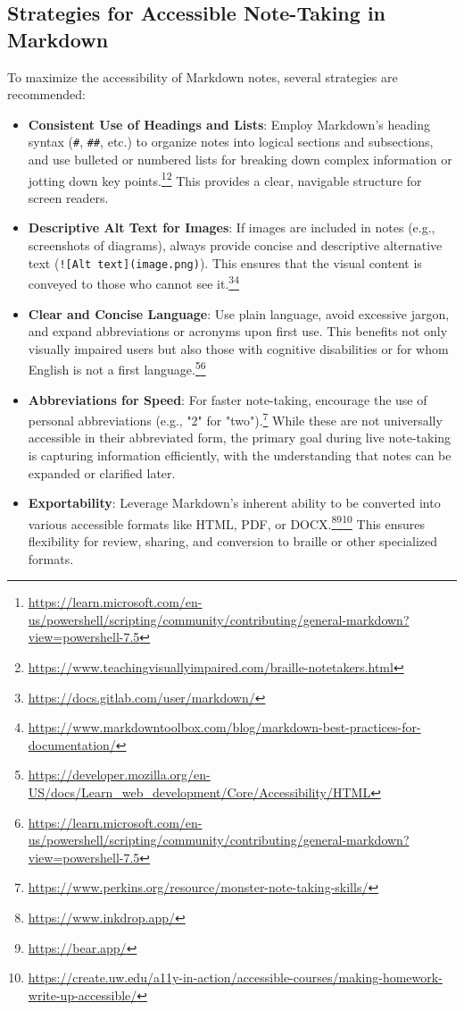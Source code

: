 \subsection{Strategies for Accessible Note-Taking in Markdown}
To maximize the accessibility of Markdown notes, several strategies are recommended:
\begin{itemize}[noitemsep,topsep=0pt]
    \item \textbf{Consistent Use of Headings and Lists}: Employ Markdown's heading syntax (\texttt{\#}, \texttt{\#\#}, etc.) to organize notes into logical sections and subsections, and use bulleted or numbered lists for breaking down complex information or jotting down key points.\footnote{\url{https://learn.microsoft.com/en-us/powershell/scripting/community/contributing/general-markdown?view=powershell-7.5}}\footnote{\url{https://www.teachingvisuallyimpaired.com/braille-notetakers.html}} This provides a clear, navigable structure for screen readers.
    \item \textbf{Descriptive Alt Text for Images}: If images are included in notes (e.g., screenshots of diagrams), always provide concise and descriptive alternative text (\texttt{![Alt text](image.png)}). This ensures that the visual content is conveyed to those who cannot see it.\footnote{\url{https://docs.gitlab.com/user/markdown/}}\footnote{\url{https://www.markdowntoolbox.com/blog/markdown-best-practices-for-documentation/}}
    \item \textbf{Clear and Concise Language}: Use plain language, avoid excessive jargon, and expand abbreviations or acronyms upon first use. This benefits not only visually impaired users but also those with cognitive disabilities or for whom English is not a first language.\footnote{\url{https://developer.mozilla.org/en-US/docs/Learn_web_development/Core/Accessibility/HTML}}\footnote{\url{https://learn.microsoft.com/en-us/powershell/scripting/community/contributing/general-markdown?view=powershell-7.5}}
    \item \textbf{Abbreviations for Speed}: For faster note-taking, encourage the use of personal abbreviations (e.g., "2" for "two").\footnote{\url{https://www.perkins.org/resource/monster-note-taking-skills/}} While these are not universally accessible in their abbreviated form, the primary goal during live note-taking is capturing information efficiently, with the understanding that notes can be expanded or clarified later.
    \item \textbf{Exportability}: Leverage Markdown's inherent ability to be converted into various accessible formats like HTML, PDF, or DOCX.\footnote{\url{https://www.inkdrop.app/}}\footnote{\url{https://bear.app/}}\footnote{\url{https://create.uw.edu/a11y-in-action/accessible-courses/making-homework-write-up-accessible/}} This ensures flexibility for review, sharing, and conversion to braille or other specialized formats.
\end{itemize}
